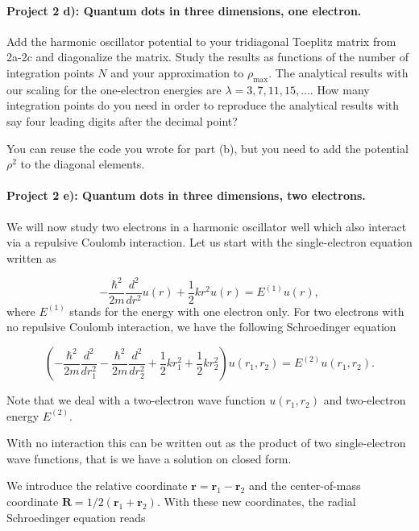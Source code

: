 \documentclass[%
oneside,                 %
final,                   %
10pt]{article}
\begin{document}
\paragraph{Project 2 d): Quantum dots in three dimensions, one electron.}
Add the harmonic oscillator potential to your tridiagonal Toeplitz matrix from 2a-2c and diagonalize the matrix.
Study the results as functions of the number of integration points $N$ and your approximation to $\rho_{\mathrm{max}}$. 
The analytical results with our scaling for the one-electron energies are $\lambda=3,7,11,15,\dots$. How many integration points do you need in order to reproduce the analytical results with say four leading digits after the decimal point?

You can reuse the code you wrote for part (b), 
but you need to add  the potential $\rho^2$ to the diagonal elements. 

\paragraph{Project 2 e): Quantum dots in three dimensions, two electrons.}
We will now study two electrons in a harmonic oscillator well which
also interact via a repulsive Coulomb interaction.
Let us start with the single-electron equation written as

\begin{equation*}
  -\frac{\hbar^2}{2 m} \frac{d^2}{dr^2} u(r) 
       + \frac{1}{2}k r^2u(r)  = E^{(1)} u(r),
\end{equation*}
where $E^{(1)}$ stands for the energy with one electron only.
For two electrons with no repulsive Coulomb interaction, we have the following 
Schroedinger equation

\begin{equation*}
\left(  -\frac{\hbar^2}{2 m} \frac{d^2}{dr_1^2} -\frac{\hbar^2}{2 m} \frac{d^2}{dr_2^2}+ \frac{1}{2}k r_1^2+ \frac{1}{2}k r_2^2\right)u(r_1,r_2)  = E^{(2)} u(r_1,r_2) .
\end{equation*}


Note that we deal with a two-electron wave function $u(r_1,r_2)$ and 
two-electron energy $E^{(2)}$.

With no interaction this can be written out as the product of two
single-electron wave functions, that is we have a solution on closed form.

We introduce the relative coordinate $\mathbf{r} = \mathbf{r}_1-\mathbf{r}_2$
and the center-of-mass coordinate $\mathbf{R} = 1/2(\mathbf{r}_1+\mathbf{r}_2)$.
With these new coordinates, the radial Schroedinger equation reads
\end{document}
